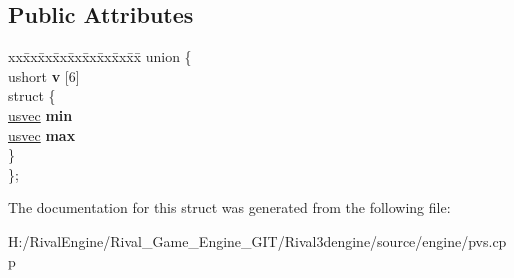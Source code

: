\subsection*{Public Attributes}
\begin{DoxyCompactItemize}
\item 
\mbox{\label{structshaftbb_ace7be25891f47ff623126f8bc233e96d}} 
\begin{tabbing}
xx\=xx\=xx\=xx\=xx\=xx\=xx\=xx\=xx\=\kill
union \{\\
\>ushort {\bfseries v} \mbox{[}6\mbox{]}\\
\mbox{\label{unionshaftbb_1_1_0D58_adffdbffb5d25279294db6c68a4e99cb2}} 
\>struct \{\\
\>\>\hyperlink{structusvec}{usvec} {\bfseries min}\\
\>\>\hyperlink{structusvec}{usvec} {\bfseries max}\\
\>\} \\
\}; \\

\end{tabbing}\end{DoxyCompactItemize}


The documentation for this struct was generated from the following file\+:\begin{DoxyCompactItemize}
\item 
H\+:/\+Rival\+Engine/\+Rival\+\_\+\+Game\+\_\+\+Engine\+\_\+\+G\+I\+T/\+Rival3dengine/source/engine/pvs.\+cpp\end{DoxyCompactItemize}
